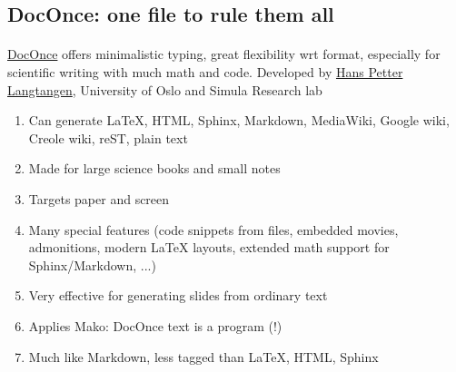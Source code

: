\documentclass[%
twoside,                 %
final,                   %
10pt]{article}
\begin{document}
\subsection{DocOnce: one file to rule them all}

\paragraph{}

\href{{http://hplgit.github.io/doconce/doc/web/index.html}}{DocOnce} offers minimalistic typing, great flexibility wrt format, especially for scientific writing with much math and code. Developed by \href{{http://hplgit.github.io/homepage/index.html}}{Hans Petter Langtangen}, University of Oslo and Simula Research lab

\begin{enumerate}
\item Can generate {\LaTeX}, HTML, Sphinx, Markdown, MediaWiki, Google wiki, Creole wiki, reST, plain text

\item Made for large science books and small notes

\item Targets paper and screen

\item Many special features (code snippets from files, embedded movies, admonitions, modern {\LaTeX} layouts, extended math support for Sphinx/Markdown, ...)

\item Very effective for generating slides from ordinary text

\item Applies Mako: DocOnce text is a program (!)

\item Much like Markdown, less tagged than {\LaTeX}, HTML, Sphinx
\end{enumerate}

\noindent

























\printindex
\end{document}
